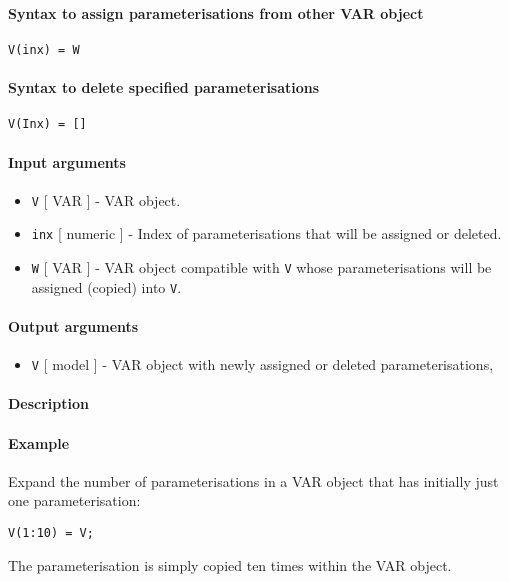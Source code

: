 


	\paragraph{Syntax to assign parameterisations from other VAR
object}

\begin{verbatim}
V(inx) = W
\end{verbatim}

\paragraph{Syntax to delete specified
parameterisations}

\begin{verbatim}
V(Inx) = []
\end{verbatim}

\paragraph{Input arguments}

\begin{itemize}
\item
  \texttt{V} {[} VAR {]} - VAR object.
\item
  \texttt{inx} {[} numeric {]} - Index of parameterisations that will be
  assigned or deleted.
\item
  \texttt{W} {[} VAR {]} - VAR object compatible with \texttt{V} whose
  parameterisations will be assigned (copied) into \texttt{V}.
\end{itemize}

\paragraph{Output arguments}

\begin{itemize}
\itemsep1pt\parskip0pt
\item
  \texttt{V} {[} model {]} - VAR object with newly assigned or deleted
  parameterisations,
\end{itemize}

\paragraph{Description}

\paragraph{Example}

Expand the number of parameterisations in a VAR object that has
initially just one parameterisation:

\begin{verbatim}
V(1:10) = V;
\end{verbatim}

The parameterisation is simply copied ten times within the VAR object.


